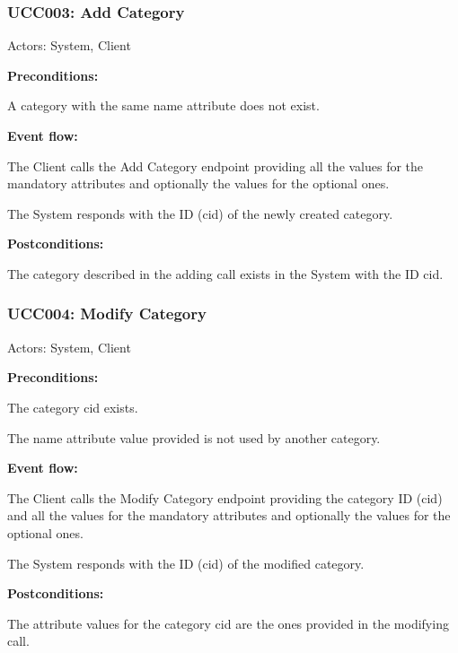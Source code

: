 \begin{ucbox}{\subsubsection{UCC003: Add Category}}
\label{UCC003}

Actors: System, Client

\textbf{Preconditions:}

\ucitem A category with the same name attribute does not exist.

\textbf{Event flow:}

\ucitem The Client calls the Add Category endpoint providing all the values for the mandatory attributes and optionally the values for the optional ones.

\ucitem The System responds with the ID (cid) of the newly created category.

\textbf{Postconditions:}

\ucitem The category described in the adding call exists in the System with the ID cid.

\end{ucbox}

\begin{ucbox}{\subsubsection{UCC004: Modify Category}}
\label{UCC004}

Actors: System, Client

\textbf{Preconditions:}

\ucitem The category cid exists.

\ucitem The name attribute value provided is not used by another category.

\textbf{Event flow:}

\ucitem The Client calls the Modify Category endpoint providing the category ID (cid) and all the values for the mandatory attributes and optionally the values for the optional ones.

\ucitem The System responds with the ID (cid) of the modified category.

\textbf{Postconditions:}

\ucitem The attribute values for the category cid are the ones provided in the modifying call.

\end{ucbox}


